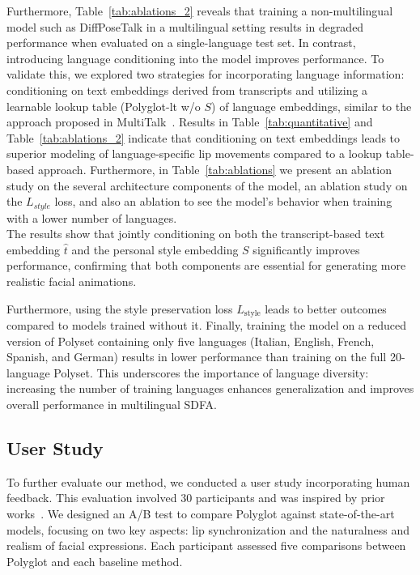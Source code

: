 \documentclass[a4paper, 10pt, conference]{ieeeconf}      %
\begin{document}
Furthermore, Table~\ref{tab:ablations_2} reveals that training a non-multilingual model such as DiffPoseTalk in a multilingual setting results in degraded performance when evaluated on a single-language test set. In contrast, introducing language conditioning into the model improves performance. To validate this, we explored two strategies for incorporating language information: conditioning on text embeddings derived from transcripts and utilizing a learnable lookup table (Polyglot-lt w/o \(S\)) of language embeddings, similar to the approach proposed in MultiTalk~\cite{sungbin2024multitalkenhancing3dtalking}. Results in Table~\ref{tab:quantitative} and Table~\ref{tab:ablations_2} indicate that conditioning on text embeddings leads to superior modeling of language-specific lip movements compared to a lookup table-based approach. 
Furthermore, in Table~\ref{tab:ablations} we present an ablation study on the several architecture components of the model, an ablation study on the \(L_{style}\) loss, and also an ablation to see the model's behavior when training with a lower number of languages. \\
The results show that jointly conditioning on both the transcript-based text embedding \(\hat{t}\) and the personal style embedding \(S\) significantly improves performance, confirming that both components are essential for generating more realistic facial animations.

Furthermore, using the style preservation loss \(L_{\text{style}}\) leads to better outcomes compared to models trained without it. Finally, training the model on a reduced version of Polyset containing only five languages (Italian, English, French, Spanish, and German) results in lower performance than training on the full 20-language Polyset. This underscores the importance of language diversity: increasing the number of training languages enhances generalization and improves overall performance in multilingual SDFA.

\subsection{User Study}
\label{sec:us}
To further evaluate our method, we conducted a user study incorporating human feedback. This evaluation involved $30$ participants and was inspired by prior works~\cite{Fan_Lin_Saito_Wang_Komura_faceformer_2022, facexhubert, peng2023selftalk, richard2021meshtalk, sun2023diffposetalk, nocentini2024scantalk3dtalkingheads}. We designed an A/B test to compare Polyglot against state-of-the-art models, focusing on two key aspects: lip synchronization and the naturalness and realism of facial expressions. Each participant assessed five comparisons between Polyglot and each baseline method. 
\end{document}
